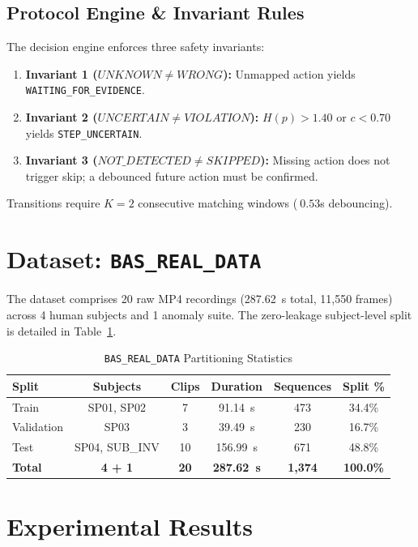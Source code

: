 \documentclass[journal,twocolumn]{IEEEtran}
\begin{document}
\subsection{Protocol Engine \& Invariant Rules}
The decision engine enforces three safety invariants:
\begin{enumerate}
    \item \textbf{Invariant 1 ($UNKNOWN \ne WRONG$):} Unmapped action yields \texttt{WAITING\_FOR\_EVIDENCE}.
    \item \textbf{Invariant 2 ($UNCERTAIN \ne VIOLATION$):} $H(p) > 1.40$ or $c < 0.70$ yields \texttt{STEP\_UNCERTAIN}.
    \item \textbf{Invariant 3 ($NOT\_DETECTED \ne SKIPPED$):} Missing action does not trigger skip; a debounced future action must be confirmed.
\end{enumerate}
Transitions require $K=2$ consecutive matching windows ($~0.53$s debouncing).

\section{Dataset: \texttt{BAS\_REAL\_DATA}}
The dataset comprises 20 raw MP4 recordings (287.62~s total, 11,550 frames) across 4 human subjects and 1 anomaly suite. The zero-leakage subject-level split is detailed in Table~\ref{tab:dataset}.

\begin{table}[htbp]
\caption{\texttt{BAS\_REAL\_DATA} Partitioning Statistics}
\label{tab:dataset}
\centering
\begin{tabular}{lccccc}
\toprule
\textbf{Split} & \textbf{Subjects} & \textbf{Clips} & \textbf{Duration} & \textbf{Sequences} & \textbf{Split \%} \\
\midrule
Train & SP01, SP02 & 7 & 91.14~s & 473 & 34.4\% \\
Validation & SP03 & 3 & 39.49~s & 230 & 16.7\% \\
Test & SP04, SUB\_INV & 10 & 156.99~s & 671 & 48.8\% \\
\midrule
\textbf{Total} & \textbf{4 + 1} & \textbf{20} & \textbf{287.62~s} & \textbf{1,374} & \textbf{100.0\%} \\
\bottomrule
\end{tabular}
\end{table}

\section{Experimental Results}
\end{document}
